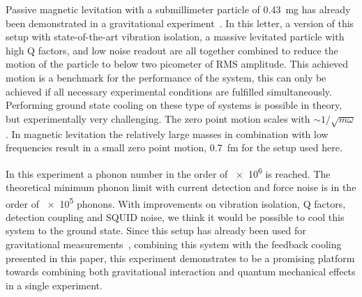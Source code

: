 Passive magnetic levitation with a submillimeter particle of \SI{0.43}{mg} has already been demonstrated in a gravitational experiment~\cite{Gravity}. In this letter, a version of this setup with state-of-the-art vibration isolation, a massive levitated particle with high Q factors, and low noise readout are all together combined to reduce the motion of the particle to below two picometer of RMS amplitude. This achieved motion is a benchmark for the performance of the system, this can only be achieved if all necessary experimental conditions are fulfilled simultaneously. Performing ground state cooling on these type of systems is possible in theory, but experimentally very challenging. The zero point motion scales with $\sim 1/\sqrt{m \omega}$. In magnetic levitation the relatively large masses in combination with low frequencies result in a small zero point motion, \SI{0.7}{fm} for the setup used here.


In this experiment a phonon number in the order of \SI{e6}{} is reached. The theoretical minimum phonon limit with current detection and force noise is in the order of \SI{e5}{} phonons. With improvements on vibration isolation, Q factors, detection coupling and SQUID noise, we think it would be possible to cool this system to the ground state. 
Since this setup has already been used for gravitational measurements~\cite{Gravity}, combining this system with the feedback cooling presented in this paper, this experiment demonstrates to be a promising platform towards combining both gravitational interaction and quantum mechanical effects in a single experiment.

    
